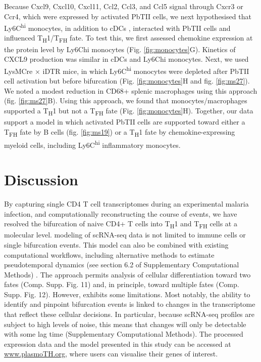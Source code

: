 Because Cxcl9, Cxcl10, Cxcl11, Ccl2, Ccl3, and Ccl5 signal through Cxcr3 or Ccr4, which were expressed by activated PbTII cells, we next hypothesised that Ly6C\textsuperscript{hi} monocytes, in addition to cDCs \cite{Groom2012-az}, interacted with PbTII cells and influenced T\textsubscript{H}1/T\textsubscript{FH} fate. To test this, we first assessed chemokine expression at the protein level by Ly6Chi monocytes (Fig. \ref{fig:monocytes}G). Kinetics of CXCL9 production was similar in cDCs and Ly6Chi monocytes. Next, we used LysMCre × iDTR mice, in which Ly6C\textsuperscript{hi} monocytes were depleted after PbTII cell activation but before bifurcation (Fig. \ref{fig:monocytes}H and fig. \ref{fig:ms27}). We noted a modest reduction in CD68+ splenic macrophages using this approach (fig. \ref{fig:ms27}B). Using this approach, we found that monocytes/macrophages supported a T\textsubscript{H}1 but not a T\textsubscript{FH} fate (Fig. \ref{fig:monocytes}H). Together, our data support a model in which activated PbTII cells are supported toward either a T\textsubscript{FH} fate by B cells (fig. \ref{fig:ms19}) or a T\textsubscript{H}1 fate by chemokine-expressing myeloid cells, including Ly6C\textsuperscript{hi} inflammatory monocytes.

\section{Discussion}

By capturing single CD4 T cell transcriptomes during an experimental malaria infection, and computationally reconstructing the course of events, we have resolved the bifurcation of naive CD4+ T cells into T\textsubscript{H}1 and T\textsubscript{FH} cells at a molecular level.  modeling of scRNA-seq data is not limited to immune cells or single bifurcation events. This model can also be combined with existing computational workflows, including alternative methods to estimate pseudotemporal dynamics (see section 6.2 of Supplementary Computational Methods) \cite{Trapnell2014-cn, Bendall2014-kg}. The  approach permits analysis of cellular differentiation toward two fates (Comp. Supp. Fig. 11) and, in principle, toward multiple fates (Comp. Supp. Fig. 12). However,  exhibits some limitations. Most notably, the ability to identify and pinpoint bifurcation events is linked to changes in the transcriptome that reflect these cellular decisions. In particular, because scRNA-seq profiles are subject to high levels of noise, this means that changes will only be detectable with some lag time (Supplementary Computational Methods). The processed expression data and the  model presented in this study can be accessed at \url{www.plasmoTH.org}, where users can visualise their genes of interest.

